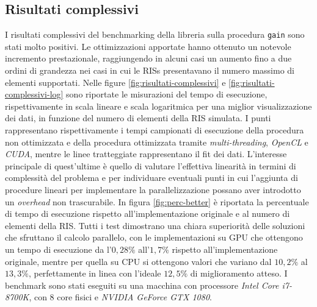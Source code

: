 \subsection{Risultati complessivi}
\label{subsec:risultati-complessivi}

I risultati complessivi del benchmarking della libreria sulla procedura \texttt{gain}
sono stati molto positivi. Le ottimizzazioni apportate hanno ottenuto un
notevole incremento prestazionale, raggiungendo in alcuni casi un aumento fino a
due ordini di grandezza nei casi in cui le RISs presentavano il numero massimo di
elementi supportati. Nelle figure \ref{fig:risultati-complessivi} e
\ref{fig:risultati-complessivi-log} sono riportate le misurazioni del tempo di
esecuzione, rispettivamente in scala lineare e scala logaritmica per una miglior
visualizzazione dei dati, in funzione del numero di elementi della RIS simulata.
I punti rappresentano rispettivamente i tempi campionati di esecuzione della procedura
non ottimizzata e della procedura ottimizzata tramite \textit{multi-threading}, \textit{OpenCL}
e \textit{CUDA}, mentre le linee tratteggiate rappresentano il fit dei dati. L'interesse
principale di quest'ultime è quello di valutare l'effettiva linearità in termini
di complessità del problema e per individuare eventuali punti in cui l'aggiunta di
procedure lineari per implementare la parallelizzazione possano aver introdotto un
\textit{overhead} non trascurabile. In figura \ref{fig:perc-better} è riportata la
percentuale di tempo di esecuzione rispetto all'implementazione originale e al numero
di elementi della RIS. Tutti i test dimostrano una chiara superiorità delle
soluzioni che sfruttano il calcolo parallelo, con le implementazioni su GPU che ottengono
un tempo di esecuzione da l'$0,28\%$ all'$1,7\%$ rispetto all'implementazione originale,
mentre per quella su CPU si ottengono valori che variano dal $10,2\%$ al
$13,3\%$, perfettamente in linea con l'ideale $12,5\%$ di miglioramento atteso.
I benchmark sono stati eseguiti su una macchina con processore \textit{Intel
Core i7-8700K}, con $8$ core fisici e \textit{NVIDIA GeForce GTX 1080}.

